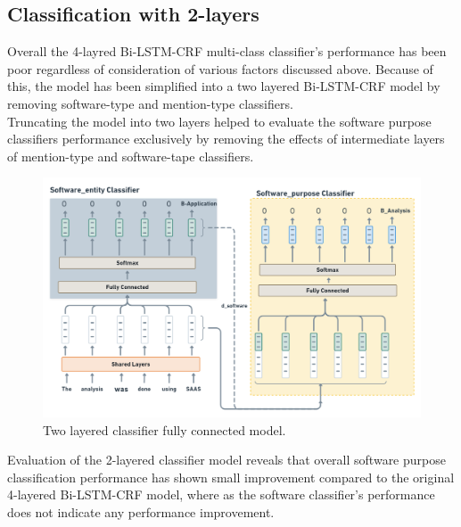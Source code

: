\subsection{Classification with 2-layers}
\label{sec:chapter06:2lc}

Overall the 4-layred \ac{Bi-LSTM-CRF} multi-class classifier’s performance has been poor regardless of consideration of various factors discussed above. Because of this, the model has been simplified into a two layered \ac{Bi-LSTM-CRF} model by removing software-type and mention-type classifiers. \\

Truncating the model into two layers helped to evaluate the software purpose classifiers performance exclusively by removing the effects of intermediate layers of mention-type and software-tape classifiers. \\

\begin{figure}[htbp]
	\centering
	\includegraphics[width=.90\textwidth]{4.graphics/figures/ch_5/2LC}
	\caption{Two layered classifier fully connected model.}
	\label{fig:chapter06:with}
\end{figure}

Evaluation of the 2-layered classifier model reveals that overall software purpose classification performance has shown small improvement compared to the original 4-layered \ac{Bi-LSTM-CRF} model, where as the software classifier’s performance does not indicate any performance improvement.  

